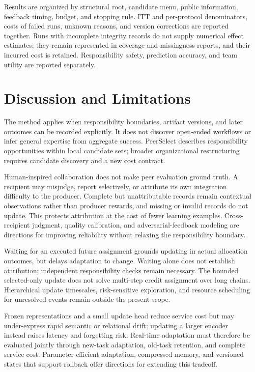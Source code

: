\documentclass[sigconf,anonymous]{aamas}
\begin{document}
Results are organized by structural root, candidate menu, public information, feedback timing, budget, and stopping rule. ITT and per-protocol denominators, costs of failed runs, unknown reasons, and version corrections are reported together. Runs with incomplete integrity records do not supply numerical effect estimates; they remain represented in coverage and missingness reports, and their incurred cost is retained. Responsibility safety, prediction accuracy, and team utility are reported separately.

\section{Discussion and Limitations}
The method applies when responsibility boundaries, artifact versions, and later outcomes can be recorded explicitly. It does not discover open-ended workflows or infer general expertise from aggregate success. PeerSelect describes responsibility opportunities within local candidate sets; broader organizational restructuring requires candidate discovery and a new cost contract.

Human-inspired collaboration does not make peer evaluation ground truth. A recipient may misjudge, report selectively, or attribute its own integration difficulty to the producer. Complete but unattributable records remain contextual observations rather than producer rewards, and missing or invalid records do not update. This protects attribution at the cost of fewer learning examples. Cross-recipient judgment, quality calibration, and adversarial-feedback modeling are directions for improving reliability without relaxing the responsibility boundary.

Waiting for an executed future assignment grounds updating in actual allocation outcomes, but delays adaptation to change. Waiting alone does not establish attribution; independent responsibility checks remain necessary. The bounded selected-only update does not solve multi-step credit assignment over long chains. Hierarchical update timescales, risk-sensitive exploration, and resource scheduling for unresolved events remain outside the present scope.

Frozen representations and a small update head reduce service cost but may under-express rapid semantic or relational drift; updating a larger encoder instead raises latency and forgetting risk. Real-time adaptation must therefore be evaluated jointly through new-task adaptation, old-task retention, and complete service cost. Parameter-efficient adaptation, compressed memory, and versioned states that support rollback offer directions for extending this tradeoff.
\end{document}
